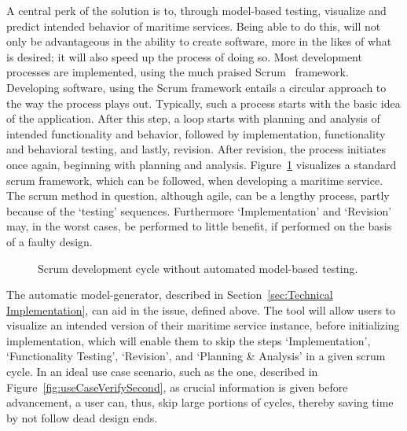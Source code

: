 A central perk of the solution is to, through model-based testing, visualize and predict intended behavior of maritime services. Being able to do this, will not only be advantageous in the ability to create software, more in the likes of what is desired; it will also speed up the process of doing so. Most development processes are implemented, using the much praised Scrum~\cite{scrum} framework. Developing software, using the Scrum framework entails a circular approach to the way the process plays out. Typically, such a process starts with the basic idea of the application. After this step, a loop starts with planning and analysis of intended functionality and behavior, followed by implementation, functionality and behavioral testing, and lastly, revision. After revision, the process initiates once again, beginning with planning and analysis.
\newpage
\noindent
Figure~\ref{fig:scrumBig} visualizes a standard scrum framework, which can be followed, when developing a maritime service. The scrum method in question, although agile, can be a lengthy process, partly because of the `testing' sequences. Furthermore `Implementation' and `Revision' may, in the worst cases, be performed to little benefit, if performed on the basis of a faulty design.
\begin{figure}[h]
  \centering
  \caption{Scrum development cycle without automated model-based testing.}
  \label{fig:scrumBig}
\end{figure}

The automatic model-generator, described in Section~\ref{sec:Technical Implementation}, can aid in the issue, defined above. The tool will allow users to visualize an intended version of their maritime service instance, before initializing implementation, which will enable them to skip the steps `Implementation', `Functionality Testing', `Revision', and `Planning \& Analysis' in a given scrum cycle. In an ideal use case scenario, such as the one, described in Figure~\ref{fig:useCaseVerifySecond}, as crucial information is given before advancement, a user can, thus, skip large portions of cycles, thereby saving time by not follow dead design ends.

